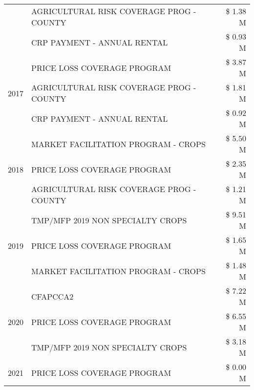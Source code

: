 \begin{tabular}{llr}
 & AGRICULTURAL RISK COVERAGE PROG - COUNTY & \$ 1.38 M \\
 & CRP PAYMENT - ANNUAL RENTAL & \$ 0.93 M \\
\cline{1-3}
\multirow[t]{3}{*}{2017} & PRICE LOSS COVERAGE PROGRAM & \$ 3.87 M \\
 & AGRICULTURAL RISK COVERAGE PROG - COUNTY & \$ 1.81 M \\
 & CRP PAYMENT - ANNUAL RENTAL & \$ 0.92 M \\
\cline{1-3}
\multirow[t]{3}{*}{2018} & MARKET FACILITATION PROGRAM - CROPS & \$ 5.50 M \\
 & PRICE LOSS COVERAGE PROGRAM & \$ 2.35 M \\
 & AGRICULTURAL RISK COVERAGE PROG - COUNTY & \$ 1.21 M \\
\cline{1-3}
\multirow[t]{3}{*}{2019} & TMP/MFP 2019 NON SPECIALTY CROPS & \$ 9.51 M \\
 & PRICE LOSS COVERAGE PROGRAM & \$ 1.65 M \\
 & MARKET FACILITATION PROGRAM - CROPS & \$ 1.48 M \\
\cline{1-3}
\multirow[t]{3}{*}{2020} & CFAPCCA2 & \$ 7.22 M \\
 & PRICE LOSS COVERAGE PROGRAM & \$ 6.55 M \\
 & TMP/MFP 2019 NON SPECIALTY CROPS & \$ 3.18 M \\
\cline{1-3}
2021 & PRICE LOSS COVERAGE PROGRAM & \$ 0.00 M \\
\cline{1-3}
\bottomrule
\end{tabular}
